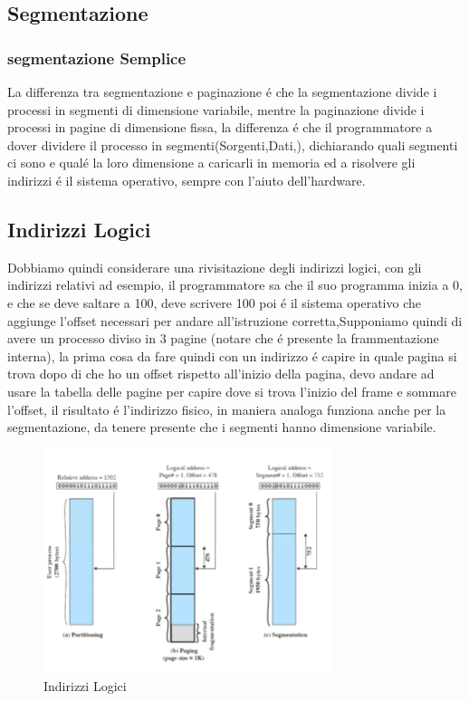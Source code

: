     \subsection{Segmentazione}
    \subsubsection*{segmentazione Semplice}
    La differenza tra segmentazione e paginazione é che la segmentazione divide i processi in segmenti di dimensione
    variabile, mentre la paginazione divide i processi in pagine di dimensione fissa, la differenza é che
    il programmatore a dover dividere il processo in segmenti(Sorgenti,Dati,\ldotsecc), dichiarando quali segmenti ci sono e qualé la loro dimensione
    a caricarli in memoria ed a risolvere gli indirizzi é il sistema operativo, sempre con l'aiuto dell'hardware.
    \subsection{Indirizzi Logici}
    Dobbiamo quindi considerare una rivisitazione degli indirizzi logici,
    con gli indirizzi relativi ad esempio, il programmatore sa che il suo programma inizia a 0, e che se deve saltare
    a 100, deve scrivere 100 poi é il sistema operativo che aggiunge l'offset necessari per andare
    all'istruzione corretta,Supponiamo quindi di avere un processo diviso in 3 pagine (notare che é presente
    la frammentazione interna), la prima cosa da fare quindi con un indirizzo é capire in quale pagina si trova dopo
    di che ho un offset rispetto all'inizio della pagina, devo andare ad usare la tabella delle pagine per capire dove
    si trova l'inizio del frame e sommare l'offset, il risultato é l'indirizzo fisico, in maniera analoga
    funziona anche per la segmentazione, da tenere presente che i segmenti hanno dimensione variabile.
    \begin{figure}[H]
        \centering
        \includegraphics[width=0.75\textwidth]{immagini/IndirizziLogici1}
        \caption{Indirizzi Logici}
    \end{figure}
